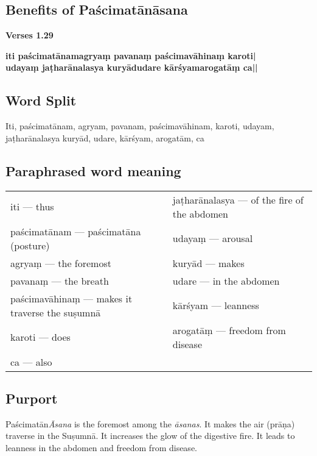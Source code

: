 \subsection*{Benefits of Paścimatānāsana}
\vspace{-10pt}

\noindent 
\textbf{Verses 1.29}

\begin{shloka}
\textbf{iti paścimatānamagryaṃ pavanaṃ paścimavāhinaṃ karoti|}\\
\textbf{udayaṃ jaṭharānalasya kuryādudare kārśyamarogatāṃ ca||}
\end{shloka}
\vspace{-10pt}

\subsection*{Word Split}
\vspace{-10pt}

Iti, paścimatānam, agryam, pavanam, paścimavāhinam, karoti, udayam, jaṭharānalasya kuryād, udare, kārśyam, arogatām, ca

\subsection*{Paraphrased word meaning}
\vspace{-10pt}

\begin{longtable}{>{\noindent\raggedright}p{5cm}>{\noindent\raggedright}p{5cm}}
iti --- thus & jaṭharānalasya --- of the fire of the abdomen\tabularnewline
paścimatānam --- paścimatāna (posture) & udayaṃ --- arousal\tabularnewline
agryaṃ  --- the foremost &  kuryād --- makes\tabularnewline
pavanaṃ --- the breath  & udare --- in the abdomen\tabularnewline
paścimavāhinaṃ --- makes it traverse the suṣumnā & kārśyam --- leanness\tabularnewline
karoti --- does & arogatāṃ --- freedom from disease \tabularnewline
ca --- also & 
\end{longtable}
\vspace{-10pt}

\subsection*{Purport}
\vspace{-10pt}

Paścimatān\textit{Āsana} is the foremost among the \textit{āsanas}. It makes the air (prāṇa) traverse in the Suṣumnā. It increases the glow of the digestive fire. It leads to leanness in the abdomen and freedom from disease.
\vspace{-10pt}

